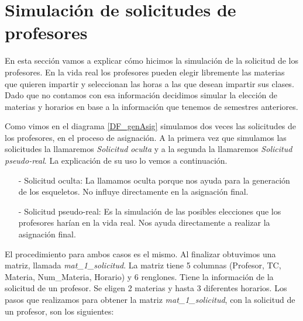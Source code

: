\section{Simulación de solicitudes de profesores} \label{SimSolicitudesProfesores}

En esta sección vamos a explicar cómo hicimos la simulación de la solicitud de los profesores. En la vida real los profesores pueden elegir libremente las materias que quieren impartir y seleccionan las horas a las que desean impartir sus clases. Dado que no contamos con esa información decidimos simular la elección de materias y horarios en base a la información que tenemos de semestres anteriores.

Como vimos en el diagrama \ref{DF_genAsig} simulamos dos veces las solicitudes de los profesores, en el proceso de asignación. A la primera vez que simulamos las solicitudes la llamaremos \textit{Solicitud oculta} y a la segunda la llamaremos \textit{Solicitud pseudo-real}. La explicación de su uso lo vemos a continuación.

\begin{itemize}
\item[-] Solicitud oculta: La llamamos oculta porque nos ayuda para la generación de los esqueletos. No influye directamente en la asignación final.

\item[-] Solicitud pseudo-real: Es la simulación de las posibles elecciones que los profesores harían en la vida real. Nos ayuda directamente a realizar la asignación final.
\end{itemize}

El procedimiento para ambos casos es el mismo. Al finalizar obtuvimos una matriz, llamada \textit{mat\_1\_solicitud}. La matriz tiene 5 columnas (Profesor, TC, Materia, Num\_Materia, Horario) y 6 renglones. Tiene la información de la solicitud de un profesor. Se eligen 2 materias y hasta 3 diferentes horarios.  Los pasos que realizamos para obtener la matriz \textit{mat\_1\_solicitud}, con la solicitud de un profesor, son los siguientes:

